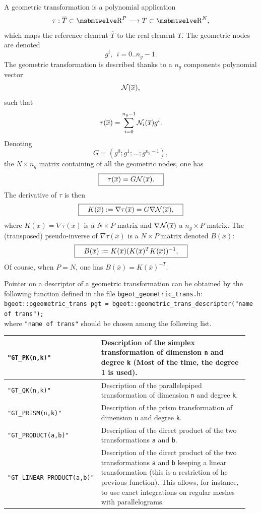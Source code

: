 \documentclass[11pt,a4paper]{article}
\begin{document}
A geometric transformation is a polynomial application
$$ \tau : \overline{T} \subset \Reel^P \longrightarrow T \subset\Reel^N, $$
which maps the reference element $\overline{T}$ to the real element $T$.
The geometric nodes are denoted
$$ g^i, \ \ i = 0 .. n_g - 1. $$
The geometric transformation is described thanks to a $n_g$ components polynomial vector
$$ {\cal N}(\overline{x}), $$
such that
$$ \tau(\overline{x}) = \sum_{i = 0}^{n_g - 1} {\cal N}_i(\overline{x}) g^i.$$
Denoting
$$ G = (g^0; g^1; ...; g^{n_g - 1}), $$
the $N \times n_g$ matrix containing of all the geometric nodes, one has
$$ \fbox{$\hspace{1em}\tau(\overline{x}) = G {\cal N}(\overline{x}).\hspace{1em}$} $$
The derivative of $\tau$ is then
$$ \fbox{$\hspace{1em} K(\overline{x}) := \nabla \tau(\overline{x}) = G \nabla {\cal N}(\overline{x}),\hspace{1em}$} $$
where $K(\overline{x}) = \nabla \tau(\overline{x})$ is a $N \times P$ matrix and $\nabla {\cal N}(\overline{x})$ a $n_g \times P$ matrix.
The (transposed) pseudo-inverse of $\nabla\tau(\overline{x})$ is a $N\times P$ matrix denoted $B(\overline{x})$:
$$ \fbox{$\hspace{1em} B(\overline{x}) := K(\overline{x})(K(\overline{x})^T K(\overline{x}))^{-1},\hspace{1em}$} $$
Of course, when $P=N$, one has $B(\overline{x})=K(\overline{x})^{-T}$.

Pointer on a descriptor of a geometric transformation can be obtained by the following function defined in the file {\tt bgeot\_geometric\_trans.h}:\\[0.5cm]
{\tt bgeot::pgeometric\_trans pgt = bgeot::geometric\_trans\_descriptor("name of trans"); }\\[0.5cm]
where {\tt "name of trans"} should be chosen among the following list.
\begin{center} \begin{tabular}{|m{0.3\linewidth}|m{0.65\linewidth}|} \hline
{\tt "GT\_PK(n,k)"} & Description of the simplex transformation of dimension {\tt n} and degree {\tt k} (Most of the time, the degree 1 is used).\\ \hline
{\tt "GT\_QK(n,k)"} & Description of the parallelepiped transformation of dimension {\tt n} and degree {\tt k}.\\ \hline
{\tt "GT\_PRISM(n,k)"} & Description of the prism transformation of dimension {\tt n} and degree {\tt k}. \\ \hline
{\tt "GT\_PRODUCT(a,b)"} & Description of the direct product of the two transformations {\tt a} and {\tt b}.\\ \hline
{\tt "GT\_LINEAR\_PRODUCT(a,b)"} & Description of the direct product of the two transformations {\tt a} and {\tt b} keeping a linear transformation (this is a restriction of he previous function). This allows, for instance, to use exact integrations on regular meshes with parallelograms.\\ \hline
\end{tabular} \end{center}
\end{document}
